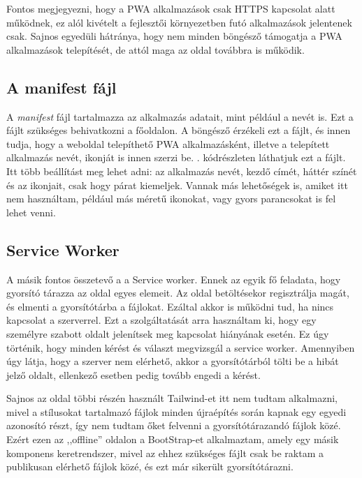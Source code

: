 \documentclass[
]{thesis-ekf}
\theoremstyle{definition}
\theoremstyle{remark}
\begin{document}
Fontos megjegyezni, hogy a PWA alkalmazások csak HTTPS kapcsolat alatt működnek, ez alól kivételt a fejlesztői környezetben futó alkalmazások jelentenek csak. Sajnos egyedüli hátránya, hogy nem minden böngésző támogatja a PWA alkalmazások telepítését, de attól maga az oldal továbbra is működik.

\subsection{A manifest fájl}

A \emph{manifest} fájl tartalmazza az alkalmazás adatait, mint például a nevét is. Ezt a fájlt szükséges behivatkozni a főoldalon. A böngésző érzékeli ezt a fájlt, és innen tudja, hogy a weboldal telepíthető PWA alkalmazásként, illetve a telepített alkalmazás nevét, ikonját is innen szerzi be. . kódrészleten láthatjuk ezt a fájlt. Itt több beállítást meg lehet adni: az alkalmazás nevét, kezdő címét, háttér színét és az ikonjait, csak hogy párat kiemeljek. Vannak más lehetőségek is, amiket itt nem használtam, például más méretű ikonokat, vagy gyors parancsokat is fel lehet venni.



\subsection{Service Worker}

A másik fontos összetevő a a Service worker. Ennek az egyik fő feladata, hogy gyorsító tárazza az oldal egyes elemeit. Az oldal betöltésekor regisztrálja magát, és elmenti a gyorsítótárba a fájlokat. Ezáltal akkor is működni tud, ha nincs kapcsolat a szerverrel. Ezt a szolgáltatását arra használtam ki, hogy egy személyre szabott oldalt jelenítsek meg kapcsolat hiányának esetén. Ez úgy történik, hogy minden kérést és választ megvizsgál a service worker. Amennyiben úgy látja, hogy a szerver nem elérhető, akkor a gyorsítótárból tölti be a hibát jelző oldalt, ellenkező esetben pedig tovább engedi a kérést. 

Sajnos az oldal többi részén használt Tailwind-et itt nem tudtam alkalmazni, mivel a stílusokat tartalmazó fájlok minden újraépítés során kapnak egy egyedi azonosító részt, így nem tudtam őket felvenni a gyorsítótárazandó fájlok közé. Ezért ezen az ,,offline'' oldalon a BootStrap-et\cite{bootstrap} alkalmaztam, amely egy másik komponens keretrendszer, mivel az ehhez szükséges fájlt csak be raktam a publikusan elérhető fájlok közé, és ezt már sikerült gyorsítótárazni.
\end{document}
